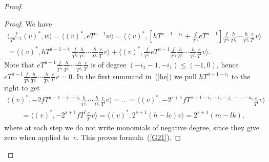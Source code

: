 \documentclass[11pt]{article}
\numberwithin{equation}{section}
\begin{document}
\begin{proof}
\begin{proof}We have
\begin{gather}
\bigg\langle \frac{f}{T^{a-1}} (v)^*, w \bigg\rangle = \big\langle (v)^*, eT^{a-1} w \big\rangle = \bigg\langle (v)^*, \left[ hT^{a-1-i_1} +
\frac{f}{T^{i_1}} eT^{a-1} \right]
 \frac{f}{T^{i_2}}\frac{h}{T^{j_1}} \cdots \frac{h}{T^{j_s}} \frac{e}{T^l}v \bigg\rangle \nonumber \\
{}= \bigg\langle (v)^*, hT^{a-1-i_1}
\frac{f}{T^{i_2}}\frac{h}{T^{j_1}} \cdots \frac{h}{T^{j_s}} \frac{e}{T^l}v \bigg\rangle +
\bigg\langle (v)^*, \frac{f}{T^{i_1}} eT^{a-1}
 \frac{f}{T^{i_2}}\frac{h}{T^{j_1}} \cdots \frac{h}{T^{j_s}} \frac{e}{T^l}v \bigg\rangle. \label{he}
\end{gather}
Note that $eT^{a-1} \frac{f}{T^{i_2}} \frac{h}{T^{j_1}} \cdots \frac{h}{T^{j_s}} \frac{e}{T^l}$ is of degree $(-i_1 - 1, -i_1) \leq (-1,0)$, hence \newline $eT^{a-1} \frac{f}{T^{i_2}} \frac{h}{T^{j_1}}\cdots\frac{h}{T^{j_s}} \frac{e}{T^{l}} v = 0$. In the first summand in~(\ref{he}) we pull $hT^{a-1-i_1}$ to the right to get
\begin{gather*}
\bigg\langle (v)^*, -2 fT^{a-1-i_1-i_2} \frac{h}{T^{j_1}} \cdots \frac{h}{T^{j_s}} \frac{e}{T^l}v \bigg\rangle = \dots = \bigg\langle (v)^*, -2^{s+1} fT^{a-1-i_1-i_2-j_1-\dots -a_s} \frac{e}{T^l}v \bigg\rangle \\
\qquad{} = \bigg\langle (v)^*, -2^{s+1} fT^{l} \frac{e}{T^l}v \bigg\rangle = \big\langle (v)^*, 2^{s+1} (h - lc) v \big\rangle = 2^{s+1} (m - lk),
\end{gather*}
where at each step we do not write monomials of negative degree, since they give zero when applied to~$v$. This proves formula~(\ref{G21}).


\end{proof}
\end{proof}
\end{document}
